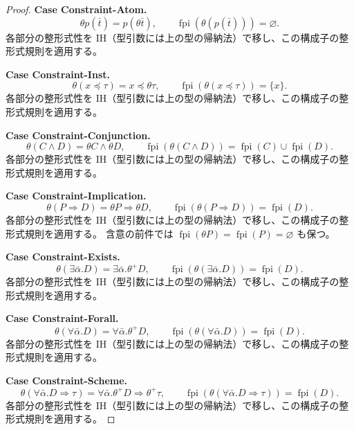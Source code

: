 \documentclass[a4paper,11pt]{article}
\theoremstyle{definition}
\newenvironment{Case}[1]{\par\smallskip\noindent\textbf{Case #1.}\enspace\ignorespaces}{\par}
\newcommand{\FPI}{\operatorname{fpi}}
\newcommand{\emp}{\varnothing}
\newcommand{\inst}[2]{#1\preccurlyeq #2}
\begin{document}
\begin{proof}
\begin{Case}{Constraint-Atom}
\[
 \theta p(\bar t)=p(\theta\bar t),\qquad\FPI(\theta(p(\bar t)))=\emp.
\]
各部分の整形式性を IH（型引数には上の型の帰納法）で移し、この構成子の整形式規則を適用する。
\end{Case}

\begin{Case}{Constraint-Inst}
\[
 \theta(\inst x\tau)=\inst x{\theta\tau},\qquad\FPI(\theta(\inst x\tau))=\{x\}.
\]
各部分の整形式性を IH（型引数には上の型の帰納法）で移し、この構成子の整形式規則を適用する。
\end{Case}

\begin{Case}{Constraint-Conjunction}
\[
 \theta(C\land D)=\theta C\land\theta D,\qquad\FPI(\theta(C\land D))=\FPI(C)\cup\FPI(D).
\]
各部分の整形式性を IH（型引数には上の型の帰納法）で移し、この構成子の整形式規則を適用する。
\end{Case}

\begin{Case}{Constraint-Implication}
\[
 \theta(P\Rightarrow D)=\theta P\Rightarrow\theta D,\qquad\FPI(\theta(P\Rightarrow D))=\FPI(D).
\]
各部分の整形式性を IH（型引数には上の型の帰納法）で移し、この構成子の整形式規則を適用する。
含意の前件では $\FPI(\theta P)=\FPI(P)=\emp$ も保つ。
\end{Case}

\begin{Case}{Constraint-Exists}
\[
 \theta(\exists\bar\alpha.D)=\exists\bar\alpha.\theta^+D,\qquad\FPI(\theta(\exists\bar\alpha.D))=\FPI(D).
\]
各部分の整形式性を IH（型引数には上の型の帰納法）で移し、この構成子の整形式規則を適用する。
\end{Case}

\begin{Case}{Constraint-Forall}
\[
 \theta(\forall\bar\alpha.D)=\forall\bar\alpha.\theta^+D,\qquad\FPI(\theta(\forall\bar\alpha.D))=\FPI(D).
\]
各部分の整形式性を IH（型引数には上の型の帰納法）で移し、この構成子の整形式規則を適用する。
\end{Case}

\begin{Case}{Constraint-Scheme}
\[
 \theta(\forall\bar\alpha.D\Rightarrow\tau)=\forall\bar\alpha.\theta^+D\Rightarrow\theta^+\tau,\qquad\FPI(\theta(\forall\bar\alpha.D\Rightarrow\tau))=\FPI(D).
\]
各部分の整形式性を IH（型引数には上の型の帰納法）で移し、この構成子の整形式規則を適用する。
\end{Case}


\end{proof}
\end{document}
